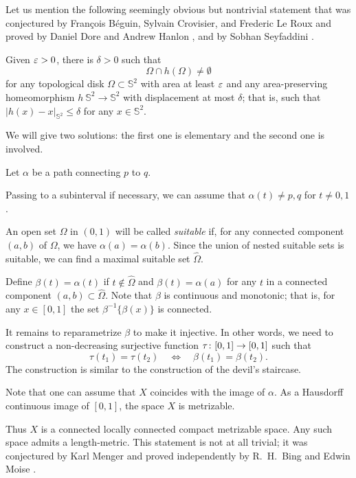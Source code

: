 Let us mention the following seemingly obvious but nontrivial statement that was conjectured by François Béguin, Sylvain Crovisier, and Frederic Le Roux \cite{rox} and proved by Daniel Dore and Andrew Hanlon \cite{dore-hanlon}, and by Sobhan Seyfaddini \cite{seyfaddini}.

\begin{pr}
Given $\varepsilon>0$, there is $\delta>0$ such that 
\[\Omega\cap h(\Omega)\ne\emptyset\]
for any topological disk $\Omega\subset \mathbb{S}^2$ with area at least $\varepsilon$
and 
any area-preserving homeomorphism $h\:\mathbb{S}^2\to\mathbb{S}^2$ with displacement at most $\delta$;
that is, such that $|h(x)-x|_{\mathbb{S}^2}\le\delta$ for any $x\in \mathbb{S}^2$.
\end{pr}


We will give two solutions: the first one is elementary and the second one is involved.

Let $\alpha$ be a path connecting $p$ to $q$.

Passing to a subinterval if necessary, we can assume that $\alpha(t)\ne p,q$ for $t\ne0,1$.

An open set $\Omega$ in $(0,1)$ will be called {}\emph{suitable} if, for any connected component $(a,b)$ of $\Omega$, we have $\alpha(a)=\alpha(b)$.
Since the union of nested suitable sets is suitable, we can find a maximal suitable set $\hat \Omega$.

Define $\beta(t)=\alpha(t)$ if $t\notin\hat \Omega$ and $\beta(t)=\alpha(a)$ for any $t$ in a connected component $(a,b)\subset\hat \Omega$.
Note that $\beta$ is continuous and monotonic;
that is, for any $x\in [0,1]$ the set $\beta^{-1}\{\beta(x)\}$ is connected.






It remains to reparametrize $\beta$ to make it injective.
In other words, we need to construct a non-decreasing surjective function $\tau\:[0,1]\z\to[0,1]$ such that 
\[\tau(t_1)=\tau(t_2)
\quad\Leftrightarrow\quad\beta(t_1)=\beta(t_2).\]
The construction is similar to the construction of the devil's staircase.\qeds

Note that one can assume that $X$ coincides with the image of $\alpha$.
As a Hausdorff continuous image of $[0,1]$, the space $X$ is metrizable.

Thus $X$ is a connected locally connected compact metrizable space.
Any such space admits a length-metric.
This statement is not at all trivial;
it was conjectured by Karl Menger \cite{menger}
and proved independently 
by R.~H.~Bing  \cite{bing-length-0, bing-length-1} 
and Edwin Moise \cite{moise}.


